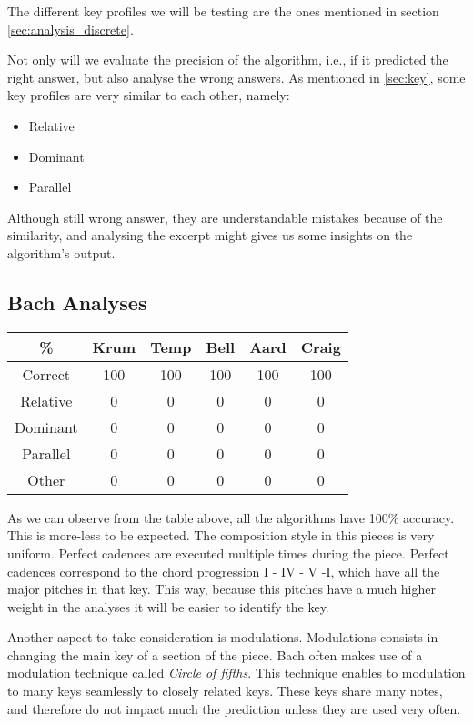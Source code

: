 The different key profiles we will be testing are the ones mentioned in section \ref{sec:analysis_discrete}.

Not only will we evaluate the precision of the algorithm, i.e., if it predicted the right answer, but also analyse the wrong answers.
As mentioned in \ref{sec:key}, some key profiles are very similar to each other, namely:
\begin{itemize}
    \item Relative
    \item Dominant
    \item Parallel
\end{itemize}

Although still wrong answer, they are understandable mistakes because of the similarity, and analysing the excerpt might gives us some insights on the algorithm's output.

\subsection{Bach Analyses} \label{sec:bach}

\begin{center}
    \begin{tabular}{|c||c c c c c||} 
    \hline
    \% & Krum & Temp & Bell & Aard & Craig \\
    \hline\hline
    Correct & 100 & 100 & 100 & 100 & 100\\ 
    \hline
    Relative & 0 & 0 & 0 & 0 & 0\\
    \hline
    Dominant & 0 & 0 & 0 & 0 & 0\\
    \hline
    Parallel & 0 & 0 & 0 & 0 & 0\\
    \hline
    Other & 0 & 0 & 0 & 0 & 0\\
    \hline
   \end{tabular}
\end{center}

As we can observe from the table above, all the algorithms have 100\% accuracy. This is more-less to be expected.
The composition style in this pieces is very uniform. 
Perfect cadences are executed multiple times during the piece.
Perfect cadences correspond to the chord progression I - IV - V -I, which have all the major pitches in that key.
This way, because this pitches have a much higher weight in the analyses it will be easier to identify the key.

Another aspect to take consideration is modulations. Modulations consists in changing the main key of a section of the piece.
Bach often makes use of a modulation technique called \textit{Circle of fifths}.
This technique enables to modulation to many keys seamlessly to closely related keys.
These keys share many notes, and therefore do not impact much the prediction unless they are used very often.

